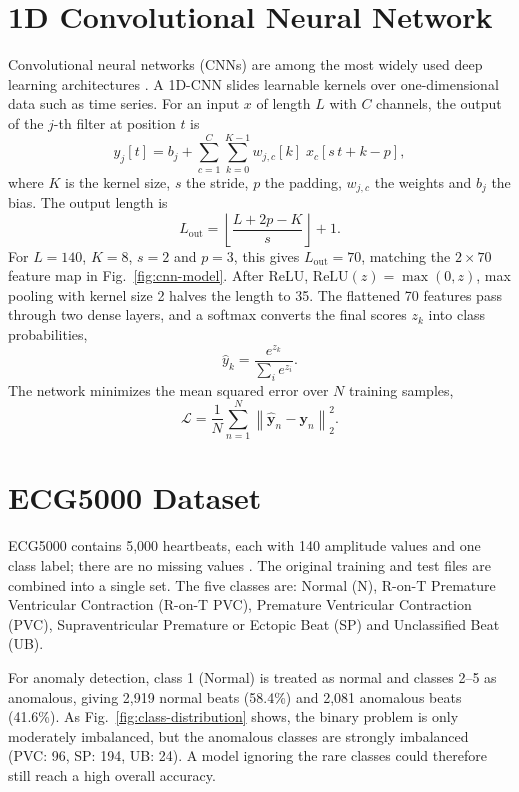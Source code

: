 \documentclass[conference]{IEEEtran}
\begin{document}
\section{1D Convolutional Neural Network}

Convolutional neural networks (CNNs) are among the most widely used deep learning architectures \citep{gharehbaghi2023}. A 1D-CNN slides learnable kernels over one-dimensional data such as time series. For an input $x$ of length $L$ with $C$ channels, the output of the $j$-th filter at position $t$ is
\begin{equation}
    y_j[t] = b_j + \sum_{c=1}^{C}\sum_{k=0}^{K-1} w_{j,c}[k]\; x_c[s\,t + k - p],
\end{equation}
where $K$ is the kernel size, $s$ the stride, $p$ the padding, $w_{j,c}$ the weights and $b_j$ the bias. The output length is
\begin{equation}
    L_{\text{out}} = \left\lfloor \frac{L + 2p - K}{s} \right\rfloor + 1 .
\end{equation}
For $L=140$, $K=8$, $s=2$ and $p=3$, this gives $L_{\text{out}}=70$, matching the $2\times70$ feature map in Fig.~\ref{fig:cnn-model}. After ReLU, $\mathrm{ReLU}(z)=\max(0,z)$, max pooling with kernel size 2 halves the length to 35. The flattened 70 features pass through two dense layers, and a softmax converts the final scores $z_k$ into class probabilities,
\begin{equation}
    \hat{y}_k = \frac{e^{z_k}}{\sum_{i} e^{z_i}} .
\end{equation}
The network minimizes the mean squared error over $N$ training samples,
\begin{equation}
    \mathcal{L} = \frac{1}{N}\sum_{n=1}^{N} \left\lVert \hat{\mathbf{y}}_n - \mathbf{y}_n \right\rVert_2^2 .
\end{equation}

\section{ECG5000 Dataset}

ECG5000 contains 5,000 heartbeats, each with 140 amplitude values and one class label; there are no missing values \citep{ferreira2022}. The original training and test files are combined into a single set. The five classes are: Normal (N), R-on-T Premature Ventricular Contraction (R-on-T PVC), Premature Ventricular Contraction (PVC), Supraventricular Premature or Ectopic Beat (SP) and Unclassified Beat (UB).

For anomaly detection, class 1 (Normal) is treated as normal and classes 2--5 as anomalous, giving 2,919 normal beats (58.4\%) and 2,081 anomalous beats (41.6\%). As Fig.~\ref{fig:class-distribution} shows, the binary problem is only moderately imbalanced, but the anomalous classes are strongly imbalanced (PVC: 96, SP: 194, UB: 24). A model ignoring the rare classes could therefore still reach a high overall accuracy.
\end{document}
